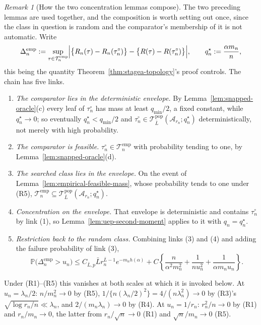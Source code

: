 \documentclass[11pt]{article}
\theoremstyle{plain}
\theoremstyle{definition}
\theoremstyle{remark}
\newtheorem{remark}[theorem]{Remark}
\newcommand{\PP}{\mathbb{P}}
\newcommand{\cA}{\mathcal{A}}
\newcommand{\cT}{\mathcal{T}}
\begin{document}
\begin{remark}[How the two concentration lemmas compose]
\label{rem:uep-chain}
The two preceding lemmas are used together, and the composition is worth
setting out once, since the class in question is random and the comparator's
membership of it is not automatic. Write
\[
  \Delta^{\mathrm{emp}}_n
  :=
  \sup_{\tau\in\cT^{\mathrm{emp}}_n}
  \Bigl|
    \bigl\{R_n(\tau)-R_n(\tau_n^\circ)\bigr\}
    -\bigl\{R(\tau)-R(\tau_n^\circ)\bigr\}
  \Bigr|,
  \qquad
  q_n^\star:=\frac{\alpha m_n}{n},
\]
this being the quantity Theorem~\ref{thm:stagea-topology}'s proof controls.
The chain has five links.
\begin{enumerate}[label=(\arabic*),leftmargin=*,nosep]
  \item \emph{The comparator lies in the deterministic envelope.} By
  Lemma~\ref{lem:snapped-oracle}(c) every leaf of \(\tau_n^\circ\) has mass at
  least \(q_{\min}/2\), a fixed constant, while \(q_n^\star\to0\); so
  eventually \(q_n^\star<q_{\min}/2\) and
  \(\tau_n^\circ\in\cT^{\mathrm{pop}}_{\bar L}(\cA_{r_n};q_n^\star)\)
  deterministically, not merely with high probability.
  \item \emph{The comparator is feasible.} \(\tau_n^\circ\in
  \cT^{\mathrm{emp}}_n\) with probability tending to one, by
  Lemma~\ref{lem:snapped-oracle}(d).
  \item \emph{The searched class lies in the envelope.} On the event of
  Lemma~\ref{lem:empirical-feasible-mass}, whose probability tends to one
  under (R5),
  \(\cT^{\mathrm{emp}}_n\subseteq
  \cT^{\mathrm{pop}}_{\bar L}(\cA_{r_n};q_n^\star)\).
  \item \emph{Concentration on the envelope.} That envelope is deterministic
  and contains \(\tau_n^\circ\) by link (1), so
  Lemma~\ref{lem:uep-second-moment} applies to it with \(q_n=q_n^\star\).
  \item \emph{Restriction back to the random class.} Combining links (3)
  and (4) and adding the failure probability of link (3),
  \[
    \PP\bigl(\Delta^{\mathrm{emp}}_n>u_n\bigr)
    \le
    C_{\bar L,p}\bar Lr_n^{\bar L-1}e^{-m_nh(\alpha)}
    +C\left\{
      \frac{n}{\alpha^2m_n^2}+\frac1{nu_n^2}+\frac1{\alpha m_nu_n}
    \right\}.
  \]
\end{enumerate}
Under (R1)--(R5) this vanishes at both scales at which it is invoked below.
At \(u_n=\lambda_n/2\): \(n/m_n^2\to0\) by (R5),
\(1/\{n(\lambda_n/2)^2\}=4/(n\lambda_n^2)\to0\) by (R3)'s
\(\sqrt{\log r_n/n}\ll\lambda_n\), and \(2/(m_n\lambda_n)\to0\) by (R4). At
\(u_n=1/r_n\): \(r_n^2/n\to0\) by (R1) and \(r_n/m_n\to0\), the latter from
\(r_n/\sqrt n\to0\) (R1) and \(\sqrt n/m_n\to0\) (R5).
\end{remark}
\end{document}
